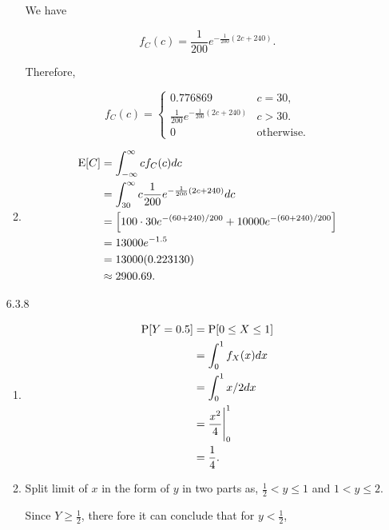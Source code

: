 \documentclass{article}
\begin{document}
\begin{enumerate}
\begin{enumerate}[label=(\alph*)]
        We have
        
        $$f_C(c) = \frac{1}{200}e^{-\frac{1}{200}(2c + 240)}.$$

        Therefore,

        $$f_C(c) = \begin{cases}
            0.776869 & c = 30, \\
            \frac{1}{200}e^{-\frac{1}{200}(2c + 240)} & c > 30. \\
            0 & \text{otherwise}.
        \end{cases}
        $$

        \item

        \begin{align*}
        \text E[C]
            & = \int_{-\infty}^\infty c f_C(c) dc \\
            & = \int_{30}^\infty c \frac{1}{200}e^{-\frac{1}{200}(2c + 240)} dc \\
            & = \Big [100 \cdot 30e^{-(60 + 240) / 200} + 10000e^{-(60 + 240) / 200} \Big] \\
            & = 13000e^{-1.5} \\
            & = 13000(0.223130) \\
            & \approx 2900.69.
        \end{align*}      
    \end{enumerate}

    \item [6.3.8]

    \begin{enumerate}[label=(\alph*)]
        \item 
        \begin{align*}
            \text P[Y = 0.5] 
            & = \text P[0 \le X \le 1] \\
            & = \int_0^1 f_X(x) dx \\
            & = \int_0^1 x / 2 dx \\
            & = \frac{x^2}{4} \Bigg |_0^1 \\
            & = \frac{1}{4}.    
        \end{align*}

        \item 
        
        Split limit of $x$ in the form of $y$ in two parts as, $\frac{1}{2} < y \le 1$ and $1 < y \le 2$.

        Since $Y \ge \frac{1}{2}$, there fore it can conclude that for $y < \frac{1}{2}$,


\end{enumerate}
\end{enumerate}
\end{document}
